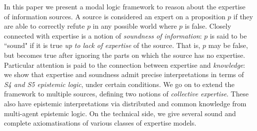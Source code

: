 In this paper we present a modal logic framework to reason about the expertise
of information sources. A source is considered an expert on a proposition $p$
if they are able to correctly refute $p$ in any possible world where $p$ is
false. Closely connected with expertise is a notion of \emph{soundness of
information}: $p$ is said to be ``sound" if it is true \emph{up to lack of
expertise} of the source. That is, $p$ may be false, but becomes true after
ignoring the parts on which the source has no expertise.
%
Particular attention is paid to the connection between expertise and
\emph{knowledge}: we show that expertise and soundness admit precise
interpretations in terms of \emph{S4 and S5 epistemic logic}, under certain
conditions.
%
We go on to extend the framework to multiple sources, defining two notions of
\emph{collective expertise}. These also have epistemic interpretations via
distributed and common knowledge from multi-agent epistemic logic.
%
On the technical side, we give several sound and complete axiomatisations of
various classes of expertise models.
